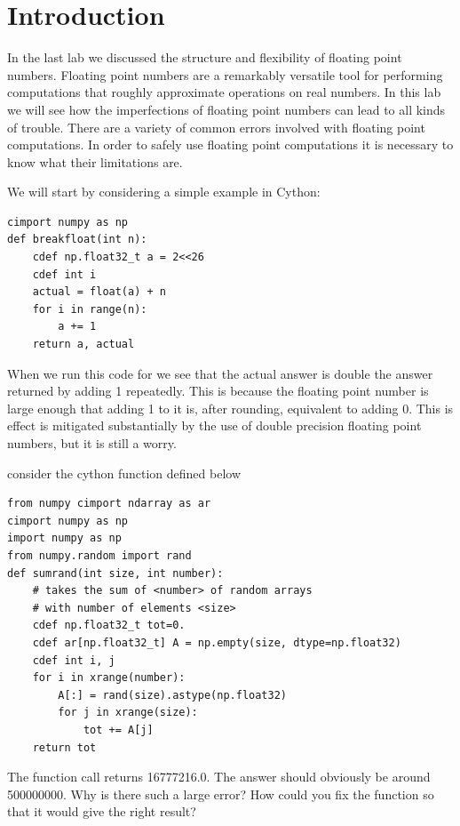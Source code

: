 \label{lab:breakfloat}

\section*{Introduction}

In the last lab we discussed the structure and flexibility of floating point numbers.
Floating point numbers are a remarkably versatile tool for performing computations that roughly approximate operations on real numbers.
In this lab we will see how the imperfections of floating point numbers can lead to all kinds of trouble.
There are a variety of common errors involved with floating point computations.
In order to safely use floating point computations it is necessary to know what their limitations are.

We will start by considering a simple example in Cython:

\begin{lstlisting}
cimport numpy as np
def breakfloat(int n):
    cdef np.float32_t a = 2<<26
    cdef int i
    actual = float(a) + n
    for i in range(n):
        a += 1
    return a, actual
\end{lstlisting}

When we run this code for  we see that the actual answer is double the answer returned by adding 1 repeatedly.
This is because the floating point number is large enough that adding 1 to it is, after rounding, equivalent to adding 0.
This is effect is mitigated substantially by the use of double precision floating point numbers, but it is still a worry.

\begin{problem}
consider the cython function defined below
\begin{lstlisting}
from numpy cimport ndarray as ar
cimport numpy as np
import numpy as np
from numpy.random import rand
def sumrand(int size, int number):
    # takes the sum of <number> of random arrays
    # with number of elements <size>
    cdef np.float32_t tot=0.
    cdef ar[np.float32_t] A = np.empty(size, dtype=np.float32)
    cdef int i, j
    for i in xrange(number):
        A[:] = rand(size).astype(np.float32)
        for j in xrange(size):
            tot += A[j]
    return tot
\end{lstlisting}
The function call  returns 16777216.0.
The answer should obviously be around 500000000.
Why is there such a large error?
How could you fix the function so that it would give the right result?
\end{problem}

